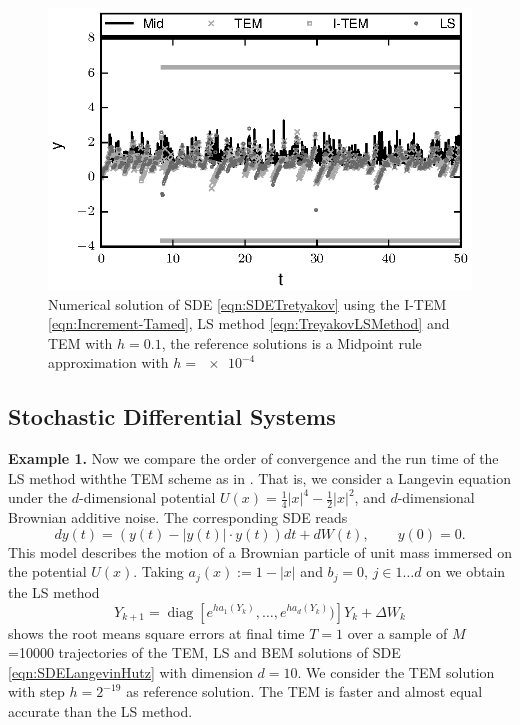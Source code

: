 \documentclass[sort&compress, preprint]{elsarticle}
\theoremstyle{definition}
\theoremstyle{plain}%
\theoremstyle{remark}
\DeclareMathOperator{\diag}{diag}
\newcommand{\SM}{LS\xspace}
\begin{document}
	\begin{figure}[h!]
		\centering
		\includegraphics{Tretyakov}
		\caption{
			Numerical solution of SDE \eqref{eqn:SDETretyakov} using the I-TEM 
			\eqref{eqn:Increment-Tamed}, \SM method \eqref{eqn:TreyakovLSMethod}  and TEM
			with $h=\num{0.1}$, the reference solutions is a Midpoint rule approximation with $h=\num{e-4}$
			}
		\label{fig:Tretyakov}
	\end{figure}
\subsection{Stochastic Differential Systems}
{\textbf{Example 1.}}
Now we compare the order of convergence
and the run time of the \SM method withthe TEM scheme as in \cite{Hutzenthaler2012a}. That is,
we consider a  Langevin equation under  the $d$-dimensional potential 
$U(x)= \frac{1}{4}|x|^4 - \frac{1}{2}|x|^2$, and $d$-dimensional Brownian additive noise. The corresponding
SDE reads
\begin{equation}\label{eqn:SDELangevinHutz}
dy(t) = 
\left(
y(t) - |y(t)| \cdot y(t)
\right)dt
+dW(t), \qquad y(0)=0.
\end{equation}
This model describes the motion of a Brownian particle of unit mass immersed on the potential $U(x)$. 
Taking $a_j(x):=1-|x|$ and $b_j=0$, $j\in 1\dots d$ on we obtain the \SM method
\begin{equation}\label{eqn:LangevinLSMethod}
	Y_{k+1} = \diag
	\left[		
		e^{h a_1(Y_k)}, \dots, e^{ha_d(Y_k)}) 
	\right] 
	Y_k+
		\Delta W_k
\end{equation}
 shows the root means square errors at final time $T=1$ over a sample of 
$M$ =\num{10000} trajectories of the TEM, \SM  and BEM solutions of SDE \eqref{eqn:SDELangevinHutz} 
with dimension $d=10$.  We consider the TEM solution with step $h=2^{-19}$ as reference solution. 
The TEM is faster and almost equal accurate than the LS method.
\end{document}
